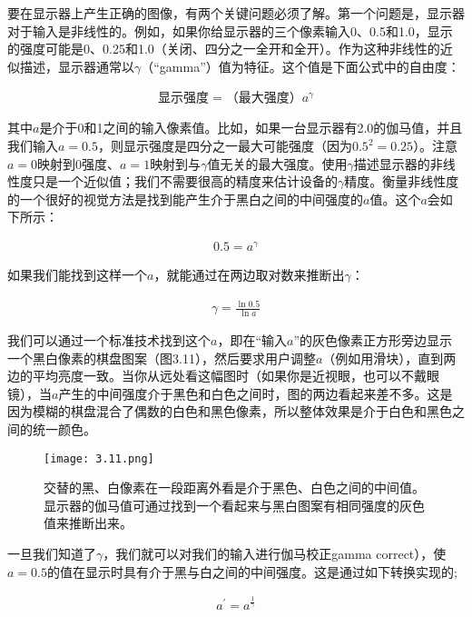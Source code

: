 \documentclass[lang=cn,12pt]{elegantbook}
\begin{document}
要在显示器上产生正确的图像，有两个关键问题必须了解。第一个问题是，显示器对于输入是非线性的。例如，如果你给显示器的三个像素输入0、0.5和1.0，显示的强度可能是0、0.25和1.0（关闭、四分之一全开和全开）。作为这种非线性的近似描述，显示器通常以$\gamma $（“gamma”）值为特征。这个值是下面公式中的自由度：

\begin{align}
  \mbox{显示强度}=\mbox{（最大强度）}a^\gamma
\end{align}

其中$a$是介于0和1之间的输入像素值。比如，如果一台显示器有2.0的伽马值，并且我们输入$a=0.5$，则显示强度是四分之一最大可能强度（因为$0.5^2=0.25$）。注意$a=0$映射到0强度、$a=1$映射到与$\gamma$值无关的最大强度。使用$\gamma$描述显示器的非线性度只是一个近似值；我们不需要很高的精度来估计设备的$\gamma$精度。衡量非线性度的一个很好的视觉方法是找到能产生介于黑白之间的中间强度的$a$值。这个$a$会如下所示：

\[
  \begin{aligned}
  0.5 = a^\gamma 
  \end{aligned}
\]

如果我们能找到这样一个$a$，就能通过在两边取对数来推断出$\gamma$：

\[
  \begin{aligned}
  \gamma = \frac{\ln 0.5}{\ln a} 
  \end{aligned}
\]

我们可以通过一个标准技术找到这个$a$，即在“输入$a$”的灰色像素正方形旁边显示一个黑白像素的棋盘图案（图3.11），然后要求用户调整$a$（例如用滑块），直到两边的平均亮度一致。当你从远处看这幅图时（如果你是近视眼，也可以不戴眼镜），当$a$产生的中间强度介于黑色和白色之间时，图的两边看起来差不多。这是因为模糊的棋盘混合了偶数的白色和黑色像素，所以整体效果是介于白色和黑色之间的统一颜色。

\begin{figure}[htb]
  \centering
  \texttt{[image: 3.11.png]}
  \caption{交替的黑、白像素在一段距离外看是介于黑色、白色之间的中间值。显示器的伽马值可通过找到一个看起来与黑白图案有相同强度的灰色值来推断出来。}
\end{figure}

一旦我们知道了$\gamma$，我们就可以对我们的输入进行伽马校正gamma correct），使$a=0.5$的值在显示时具有介于黑与白之间的中间强度。这是通过如下转换实现的;

\[
  \begin{aligned}
  a^{'} = a^{\frac{1}{\gamma } }
  \end{aligned}
\]
\end{document}

